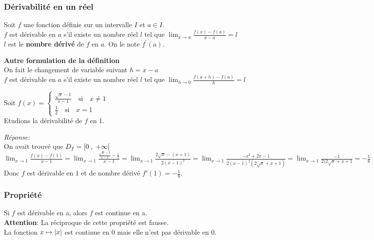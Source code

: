 \subsubsection*{Dérivabilité en un réel}
\begin{definition}
Soit $ f $ une fonction définie sur un intervalle $ I$ et $a\in I $.\\
$ f $ est dérivable en $ a $ s'il existe un nombre réel $ l $ tel que $ \displaystyle\lim_{x \to a} \frac{f(x)-f(a)}{x-a}=l $ \\
$ l $ est le  \textbf{nombre dérivé} de $ f $ en $ a. $ On le note             $f^{'}(a)$.
\end{definition}

\textbf{Autre formulation de la définition}\\
On fait le changement de variable suivant $ h=x-a $ \\
$ f $ est dérivable en $ a $ s'il existe un nombre réel $ l $ tel que $\displaystyle \lim_{h \to 0} \frac{f(a+h)-f(a)}{h}=l $ 

\begin{example}
Soit $ f (x)=\left\{\begin{array}{l} \frac{\sqrt{x}-1}{x-1}\quad \textrm{si} \quad x\neq 1 \\ \frac{1}{2}\quad \textrm{si}\quad x= 1  \end{array} \right.$\\
Etudions  la dérivabilité  de $ f $ en 1.
\end{example}
\textsl{Réponse:}\\
On avait trouvé que $D_{f}=\left[0 \;,\; +\infty\right[  $ \\
$\displaystyle \lim_{x \to 1 } \frac{f(x)-f(1)}{x-1}=\displaystyle \lim_{x \to 1 }\frac{\frac{\sqrt{x}-1}{x-1}-\frac{1}{2}}{x-1}= \lim_{x \to 1 }\frac{2\sqrt{x}-(x+1)}{2(x-1)^{2}}=\lim_{x \to 1 } \frac{-x^{2}+2x-1}{2(x-1)^{2}(2\sqrt{x}+x+1)}=\displaystyle \lim_{x \to 1 }\frac{-1}{2(2\sqrt{x}+x+1}=-\frac{1}{8}$  \\ Donc $ f $ est dérivable en $ 1 $ et de nombre dérivé $ f'(1)= -\frac{1}{8}$.
\subsubsection*{Propriété}
\begin{property}
Si $ f $ est dérivable en a, alors $ f $ est continue en a.\\
\textbf{Attention}: La réciproque de cette propriété est fausse.\\
La fonction $ x\mapsto \left\lvert x \right\rvert $ est continue en 0 mais elle n'est pas dérivable en $ 0 $.
\end{property}
